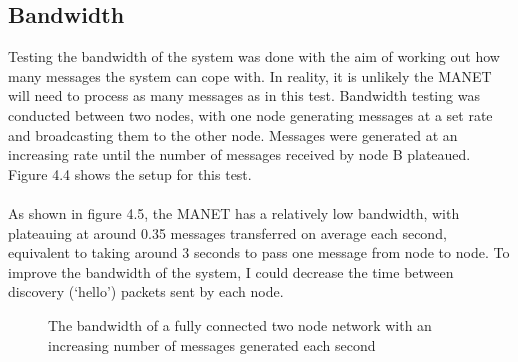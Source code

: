\documentclass[12pt,a4paper]{report}
\makeatletter
\newenvironment{figurehere}
  {\def\@captype{figure}}
  {}
\makeatother
\begin{document}
\subsection{Bandwidth}
Testing the bandwidth of the system was done with the aim of working out how many messages the system can cope with. In reality, it is unlikely the MANET will need to process as many messages as in this test. Bandwidth testing was conducted between two nodes, with one node generating messages at a set rate and broadcasting them to the other node. Messages were generated at an increasing rate until the number of messages received by node B plateaued. Figure 4.4 shows the setup for this test. \\ \\
As shown in figure 4.5, the MANET has a relatively low bandwidth, with plateauing at around 0.35 messages transferred on average each second, equivalent to taking around 3 seconds to pass one message from node to node. To improve the bandwidth of the system, I could decrease the time between discovery (`hello') packets sent by each node. 

\begin{figurehere}
\begin{center}
\end{center}
\caption{The network used for bandwidth testing}
\end{figurehere}

\begin{figure}
\begin{center}

\end{center}
\caption{The bandwidth of a fully connected two node network with an increasing number of messages generated each second}
\end{figure}
\end{document}
